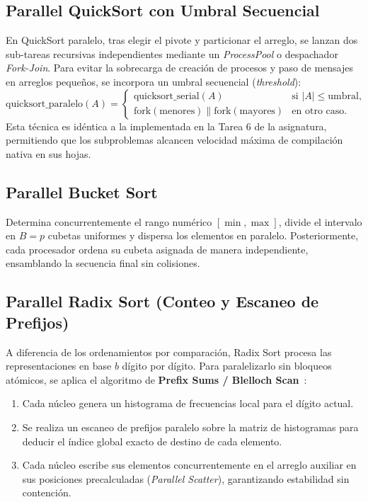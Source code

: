 \documentclass[11pt,letterpaper,oneside]{article}
\begin{document}
\subsection{Parallel QuickSort con Umbral Secuencial}
En QuickSort paralelo, tras elegir el pivote y particionar el arreglo, se lanzan dos sub-tareas recursivas independientes mediante un \emph{ProcessPool} o despachador \emph{Fork-Join}. Para evitar la sobrecarga de creación de procesos y paso de mensajes en arreglos pequeños, se incorpora un umbral secuencial (\emph{threshold}):
\begin{equation}
  \text{quicksort\_paralelo}(A) = 
  \begin{cases}
    \text{quicksort\_serial}(A) & \text{si } |A| \le \text{umbral},\\
    \text{fork}(\text{menores}) \parallel \text{fork}(\text{mayores}) & \text{en otro caso.}
  \end{cases}
\end{equation}
Esta técnica es idéntica a la implementada en la Tarea 6 de la asignatura, permitiendo que los subproblemas alcancen velocidad máxima de compilación nativa en sus hojas.

\subsection{Parallel Bucket Sort}
Determina concurrentemente el rango numérico $[\min, \max]$, divide el intervalo en $B = p$ cubetas uniformes y dispersa los elementos en paralelo. Posteriormente, cada procesador ordena su cubeta asignada de manera independiente, ensamblando la secuencia final sin colisiones.

\subsection{Parallel Radix Sort (Conteo y Escaneo de Prefijos)}
A diferencia de los ordenamientos por comparación, Radix Sort procesa las representaciones en base $b$ dígito por dígito. Para paralelizarlo sin bloqueos atómicos, se aplica el algoritmo de \textbf{Prefix Sums / Blelloch Scan}~\cite{blelloch}:
\begin{enumerate}
  \item Cada núcleo genera un histograma de frecuencias local para el dígito actual.
  \item Se realiza un escaneo de prefijos paralelo sobre la matriz de histogramas para deducir el índice global exacto de destino de cada elemento.
  \item Cada núcleo escribe sus elementos concurrentemente en el arreglo auxiliar en sus posiciones precalculadas (\emph{Parallel Scatter}), garantizando estabilidad sin contención.
\end{enumerate}
\end{document}
